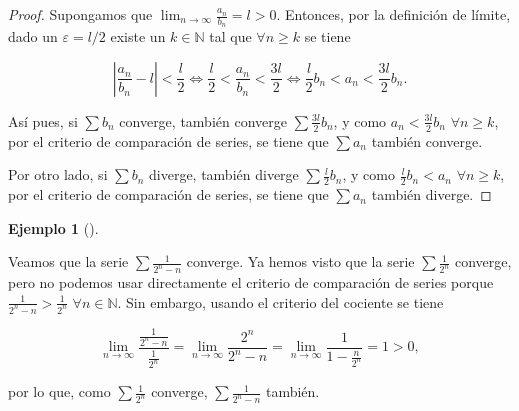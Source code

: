 \documentclass[
  a4paper,
]{scrreport}
\theoremstyle{definition}
\newtheorem{example}{Ejemplo}[chapter]
\theoremstyle{plain}
\theoremstyle{definition}
\theoremstyle{definition}
\theoremstyle{plain}
\theoremstyle{plain}
\theoremstyle{remark}
\begin{document}
\begin{tcolorbox}[enhanced jigsaw, leftrule=.75mm, colbacktitle=quarto-callout-note-color!10!white, toprule=.15mm, opacityback=0, opacitybacktitle=0.6, toptitle=1mm, breakable, bottomtitle=1mm, colframe=quarto-callout-note-color-frame, rightrule=.15mm, titlerule=0mm, title=\textcolor{quarto-callout-note-color}{\faInfo}\hspace{0.5em}{Demostración}, arc=.35mm, left=2mm, bottomrule=.15mm, colback=white, coltitle=black]

\begin{proof}
Supongamos que \(\lim_{n\to\infty} \frac{a_n}{b_n} = l>0\). Entonces,
por la definición de límite, dado un \(\varepsilon=l/2\) existe un
\(k\in\mathbb{N}\) tal que \(\forall n\geq k\) se tiene

\[
\left|\frac{a_n}{b_n}-l\right|<\frac{l}{2} \Leftrightarrow \frac{l}{2}< \frac{a_n}{b_n}<\frac{3l}{2} \Leftrightarrow \frac{l}{2}b_n<a_n<\frac{3l}{2}b_n. 
\]

Así pues, si \(\sum b_n\) converge, también converge
\(\sum \frac{3l}{2}b_n\), y como \(a_n<\frac{3l}{2}b_n\)
\(\forall n\geq k\), por el criterio de comparación de series, se tiene
que \(\sum a_n\) también converge.

Por otro lado, si \(\sum b_n\) diverge, también diverge
\(\sum \frac{l}{2}b_n\), y como \(\frac{l}{2}b_n<a_n\)
\(\forall n\geq k\), por el criterio de comparación de series, se tiene
que \(\sum a_n\) también diverge.
\end{proof}

\end{tcolorbox}

\begin{example}[]\protect\hypertarget{exm-criterio-cociente}{}\label{exm-criterio-cociente}

Veamos que la serie \(\sum \frac{1}{2^n-n}\) converge. Ya hemos visto
que la serie \(\sum \frac{1}{2^n}\) converge, pero no podemos usar
directamente el criterio de comparación de series porque
\(\frac{1}{2^n-n}>\frac{1}{2^n}\) \(\forall n\in\mathbb{N}\). Sin
embargo, usando el criterio del cociente se tiene

\[
\lim_{n\to\infty} \frac{\frac{1}{2^n-n}}{\frac{1}{2^n}} = \lim_{n\to\infty} \frac{2^n}{2^n-n} = \lim_{n\to\infty}\frac{1}{1-\frac{n}{2^n}} = 1>0,
\]

por lo que, como \(\sum \frac{1}{2^n}\) converge,
\(\sum \frac{1}{2^n-n}\) también.

\end{example}
\end{document}
